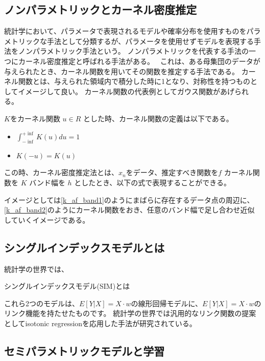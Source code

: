 \subsection{ノンパラメトリックとカーネル密度推定}
統計学において、パラメータで表現されるモデルや確率分布を使用すものをパラメトリックな手法として分類するが、パラメータを使用せずモデルを表現する手法をノンパラメトリック手法という。
ノンパラメトリックを代表する手法の一つにカーネル密度推定と呼ばれる手法がある。~\cite{kernel_density}
これは、ある母集団のデータが与えられたとき、カーネル関数を用いてその関数を推定する手法である。
カーネル関数とは、与えられた領域内で積分した時に1となり、対称性を持つものとしてイメージして良い。
カーネル関数の代表例としてガウス関数があげられる。

$ K $をカーネル関数 $ u \in R $ とした時、カーネル関数の定義は以下である。

\begin{itemize}
  \item $ \int^{+ \inf}_{- \inf} K(u)du = 1 $
  \item $ K(-u) = K(u) $
\end{itemize}


この時、カーネル密度推定法とは、$ x_n $をデータ、推定すべき関数を$ f $ カーネル関数を $ K $ バンド幅を $ h $ としたとき、以下の式で表現することができる。


イメージとしては\ref{k_af_band1}のようにまばらに存在するデータ点の周辺に、\ref{k_af_band2}のようにカーネル関数をおき、任意のバンド幅で足し合わせ近似していくイメージである。






\subsection{シングルインデックスモデルとは}

統計学の世界では、

シングルインデックスモデル(SIM)とは

これら2つのモデルは、$ E[Y|X]=X\cdot w $の線形回帰モデルに、$ E[Y|X]=X\cdot w $のリンク機能を持たせたものです。 
統計学の世界では汎用的なリンク関数の提案としてisotonic regressionを応用した手法が研究されている。




\subsection {セミパラメトリックモデルと学習}



